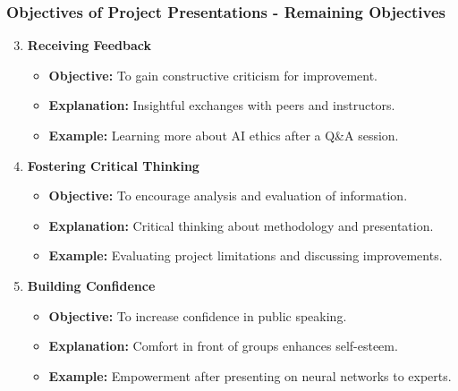 \documentclass[aspectratio=169]{beamer}
\begin{document}
\begin{frame}[fragile]
    \frametitle{Objectives of Project Presentations - Remaining Objectives}
    \begin{enumerate}
        \setcounter{enumi}{2}  %

        \item \textbf{Receiving Feedback}
        \begin{itemize}
            \item \textbf{Objective:} To gain constructive criticism for improvement.
            \item \textbf{Explanation:} Insightful exchanges with peers and instructors.
            \item \textbf{Example:} Learning more about AI ethics after a Q\&A session.
        \end{itemize}
        
        \item \textbf{Fostering Critical Thinking}
        \begin{itemize}
            \item \textbf{Objective:} To encourage analysis and evaluation of information.
            \item \textbf{Explanation:} Critical thinking about methodology and presentation.
            \item \textbf{Example:} Evaluating project limitations and discussing improvements.
        \end{itemize}

        \item \textbf{Building Confidence}
        \begin{itemize}
            \item \textbf{Objective:} To increase confidence in public speaking.
            \item \textbf{Explanation:} Comfort in front of groups enhances self-esteem.
            \item \textbf{Example:} Empowerment after presenting on neural networks to experts.
        \end{itemize}
    \end{enumerate}
\end{frame}
\end{document}
